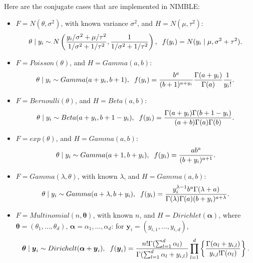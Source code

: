 \documentclass[12pt]{article}
\newcommand{\by}{\boldsymbol{y}}
\begin{document}
\begin{enumerate}
\begin{enumerate}
Here are the conjugate cases that are implemented in NIMBLE:
\begin{itemize}
\item $F=N(\theta, \sigma^2)$, with known variance $\sigma^2$, and $H=N(\mu, \tau^2)$: 
$$\theta \mid y_i \sim N\left(\frac{y_i/\sigma^2 + \mu/\tau^2}{1/\sigma^2+1/\tau^2}, \frac{1}{1/\sigma^2 +1/\tau^2} \right), \hspace{0.2cm}f(y_i)=N(y_i \mid \mu, \sigma^2+\tau^2).$$
\item $F=Poisson(\theta)$,  and $H=Gamma(a, b)$: 
$$\theta \mid y_i \sim Gamma(a+y_i, b+1), \hspace{0.2cm}f(y_i)=\frac{b^a}{(b+1)^{a+y_i}}\frac{\Gamma(a+y_i)}{\Gamma(a)}\frac{1}{y_i!}.$$
\item $F=Bernoulli(\theta)$,  and $H=Beta(a, b)$: 
$$\theta \mid y_i \sim Beta(a+y_i, b+1-y_i), \hspace{0.2cm}f(y_i)=\frac{\Gamma(a+y_i)\Gamma(b+1-y_i)}{(a+b)\Gamma(a)\Gamma(b)}.$$
\item $F=exp(\theta)$,  and $H=Gamma(a, b)$: 
$$\theta \mid y_i \sim Gamma(a+1, b+y_i), \hspace{0.2cm}f(y_i)=\frac{ab^a}{(b+y_i)^{a+1}}.$$
\item $F=Gamma(\lambda, \theta)$, with known $\lambda$, and $H=Gamma(a, b)$: 
$$\theta \mid y_i \sim Gamma(a+\lambda, b+y_i), \hspace{0.2cm}f(y_i)=\frac{y_i^{\lambda-1}b^a \Gamma(\lambda+a)}{\Gamma(\lambda)\Gamma(a)(b+y_i)^{a+\lambda}}.$$
\item $F=Multinomial(n, \boldsymbol{\theta})$,  with known $n$, and $H=Dirichlet(\boldsymbol{\alpha})$, where $\boldsymbol{\theta}=(\theta_1, \ldots, \theta_d)$,  $\boldsymbol{\alpha}=\alpha_1, \ldots, \alpha_d$: for $\by_i=(y_{i,1}, \ldots, y_{i,d})$,
$$\boldsymbol{\theta} \mid \by_i \sim Dirichelt(\boldsymbol{\alpha}+\by_i), \hspace{0.2cm}f(\by_i)=\frac{n! \Gamma(\sum_{l=1}^d\alpha_l)}{\Gamma(\sum_{l=1}^d\alpha_l+y_{i,l})}\prod_{l=1}^d\left\{ \frac{\Gamma(\alpha_l+y_{i,l})}{y_{i,l}! \Gamma(\alpha_l)}\right\}.$$
\end{itemize}





\end{enumerate}
\end{enumerate}
\end{document}
